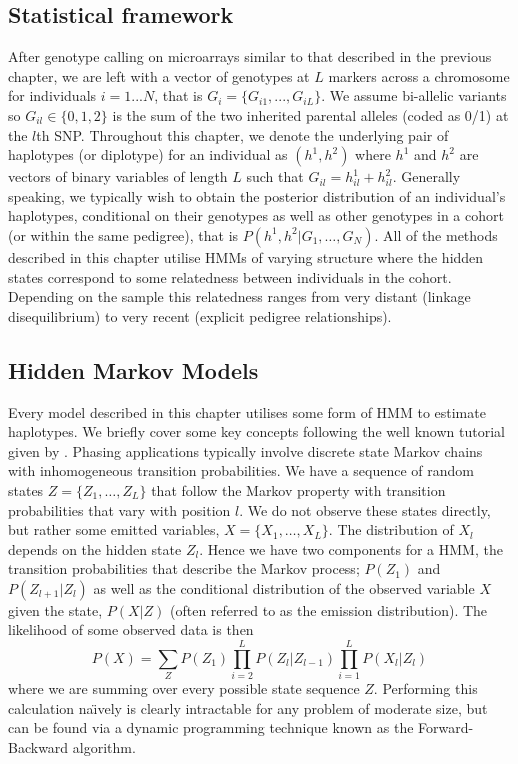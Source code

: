 \subsection{Statistical framework}
After genotype calling on microarrays similar to that described in the previous chapter, we are left with a vector of  genotypes at $L$ markers across a chromosome for individuals $i = 1...N$, that is $G_i = \{G_{i1},...,G_{iL}\}$.  We assume bi-allelic variants  so $G_{il}\in \{0,1,2\}$ is the sum of the two inherited parental alleles (coded as 0/1)  at the $l$th SNP.   Throughout this chapter, we denote the underlying pair of haplotypes (or diplotype) for an individual as $(h^1,h^2)$ where $h^1$ and $h^2$ are vectors of binary variables of length $L$ such that $G_{il} = h_{il}^1 + h_{il}^2$. Generally speaking, we typically wish to obtain the posterior distribution of an individual's haplotypes, conditional on their genotypes as well as other genotypes in a cohort (or within the same pedigree), that is $P(h^1,h^2|G_1,\ldots, G_N)$. All of the methods described in this chapter utilise HMMs of varying structure where the hidden states correspond to some relatedness between individuals in the cohort.  Depending on the sample this relatedness ranges from very distant (linkage disequilibrium) to very recent (explicit pedigree relationships).

\subsection{Hidden Markov Models}
Every model described in this chapter utilises some form of HMM to estimate haplotypes.  We briefly cover some key concepts  following the well known tutorial given by \cite{rabiner1989tutorial}.  Phasing applications typically involve discrete state Markov chains with inhomogeneous transition probabilities. We have a sequence of random states $Z=\{Z_1,\ldots,Z_L\}$ that follow the Markov property with transition probabilities that vary with position $l$. We do not observe these states directly, but rather some emitted variables, $X=\{X_1,\ldots,X_L\}$.  The distribution of $X_l$ depends on the hidden state $Z_l$. Hence we have two components for a HMM, the transition probabilities that describe the Markov process; $P(Z_1)$ and $P(Z_{l+1}|Z_l)$ as well as the conditional distribution of the observed variable $X$ given the state, $P(X|Z)$ (often referred to as the emission distribution).  The likelihood of some observed data is then
$$P(X) = \sum_Z P(Z_1) \prod_{i=2}^L P(Z_l|Z_{l-1}) \prod_{i=1}^L P(X_l|Z_l) $$
where we are summing over every possible state sequence $Z$.  Performing this calculation na\"{\i}vely is clearly intractable for any problem of moderate size, but can be found via a dynamic programming technique known as the Forward-Backward algorithm.  

